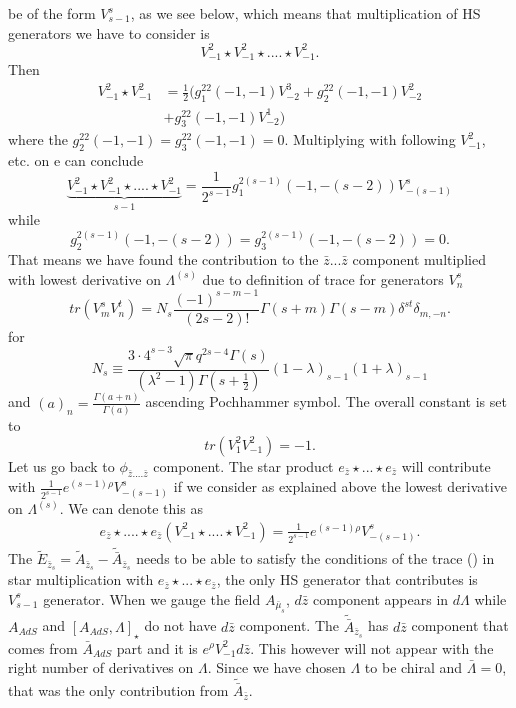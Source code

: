 \documentclass[prd,superscriptaddress,twocolumn,10pt]{revtex4}
\begin{document}
 be of the form $V^s_{s-1}$, as we see below, which means that multiplication of HS generators we have to  consider is 
\begin{equation}
V_{-1}^2\star V_{-1}^2\star....\star V_{-1}^2.
\end{equation}
Then 
\begin{align}
V_{-1}^2\star V_{-1}^2 &=\frac{1}{2}( g_1^{22}(-1,-1)V_{-2}^3+g_{2}^{22}(-1,-1)V_{-2}^2\nonumber\\&+g_{3}^{22}(-1,-1)V_{-2}^1 )
\end{align}
where the $g_2^{22}(-1,-1)=g_3^{22}(-1,-1)=0$. Multiplying with following $V_{-1}^2$, etc. on e can conclude
\begin{equation}
\underbrace{V_{-1}^{2}\star V_{-1}^2\star ....\star V_{-1}^2}_{s-1}=\frac{1}{2^{s-1}}g_1^{2(s-1)}(-1,-(s-2))V_{-(s-1)}^s
\end{equation}
while 
\begin{equation}
g_{2}^{2(s-1)}(-1,-(s-2))=g_{3}^{2(s-1)}(-1,-(s-2))=0.
\end{equation}
That  means we have found the contribution to the $\bar{z}...\bar{z}$ component multiplied with lowest derivative on $\Lambda^{(s)}$ due to definition of trace for generators $V_n^s$ 
\small
\begin{equation}
tr\left( V_m^s V_n^t \right)=N_s\frac{(-1)^{s-m-1}}{(2s-2)!}\Gamma(s+m)\Gamma(s-m)\delta^{st}\delta_{m,-n}. 
\end{equation}
\normalsize
for 
\begin{equation}
N_s\equiv \frac{3\cdot 4^{s-3}\sqrt{\pi}q^{2s-4}\Gamma(s)}{(\lambda^2-1)\Gamma(s+\frac{1}{2})}(1-\lambda)_{s-1}(1+\lambda)_{s-1}
\end{equation}
and $(a)_n=\frac{\Gamma(a+n)}{\Gamma(a)}$ ascending Pochhammer symbol. The overall constant is set to \begin{equation}tr(V_1^2V_{-1}^2)=-1.
\end{equation}
Let us go back to $\phi_{\bar{z}....\bar{z}}$ component. The star product $e_{\bar{z}}\star...\star e_{\bar{z}}$ will contribute with $\frac{1}{2^{s-1}}e^{(s-1)\rho}V^{s}_{-(s-1)}$ if we consider as explained above the lowest derivative on $\Lambda^{(s)}$. We can denote this as 
\begin{align}
e_{\bar{z}}\star....\star e_{\bar{z}}(V_{-1}^2\star ....\star V_{-1}^2)=\frac{1}{2^{s-1}}e^{(s-1)\rho}V^{s}_{-(s-1)}.\end{align} The $\tilde{E}_{\bar{z}_s}=\tilde{A}_{\bar{z}_s}-\tilde{\bar{A}}_{\bar{z}_s}$ needs to be able to satisfy the conditions of the trace () in star multiplication with $e_{\bar{z}}\star...\star e_{\bar{z}}$, the only HS generator that  contributes is $V^s_{s-1}$ generator. When we gauge the field $A_{\bar{\mu}_s}$, $d\bar{z}$ component appears in $d\Lambda$ while $A_{AdS}$ and $[A_{AdS},\Lambda]_{\star}$ do not have $d\bar{z}$ component. The $\tilde{\bar{A}}_{\bar{z}_s}$ has $d\bar{z}$ component that comes from $\bar{A}_{AdS}$ part and it is $e^{\rho}V_{-1}^2d\bar{z}$. This however will not appear with the right number of derivatives on $\Lambda$. Since we have chosen $\Lambda$ to be chiral and $\bar{\Lambda}=0$, that was the only contribution from $\tilde{\bar{A}}_{\bar{z}}$. 
\end{document}

